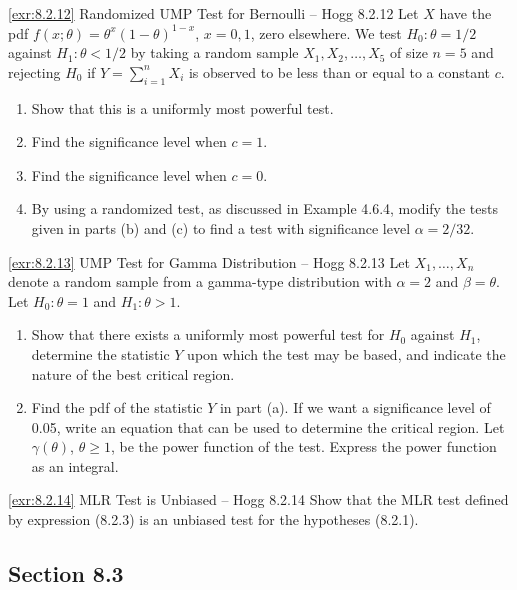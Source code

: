 \begin{exercise}{\ref{exr:8.2.12} Randomized UMP Test for Bernoulli -- Hogg 8.2.12}\label{exr:8.2.12}
Let $X$ have the pdf $f(x; \theta) = \theta^x(1-\theta)^{1-x}$, $x = 0, 1$, zero elsewhere. We test $H_0: \theta = 1/2$ against $H_1: \theta < 1/2$ by taking a random sample $X_1, X_2, \ldots, X_5$ of size $n = 5$ and rejecting $H_0$ if $Y = \sum_{i=1}^n X_i$ is observed to be less than or equal to a constant $c$.
\begin{enumerate}
\item[(a)] Show that this is a uniformly most powerful test.
\item[(b)] Find the significance level when $c = 1$.
\item[(c)] Find the significance level when $c = 0$.
\item[(d)] By using a randomized test, as discussed in Example 4.6.4, modify the tests given in parts (b) and (c) to find a test with significance level $\alpha = 2/32$.
\end{enumerate}
\end{exercise}

\begin{exercise}{\ref{exr:8.2.13} UMP Test for Gamma Distribution -- Hogg 8.2.13}\label{exr:8.2.13}
Let $X_1, \ldots, X_n$ denote a random sample from a gamma-type distribution with $\alpha = 2$ and $\beta = \theta$. Let $H_0: \theta = 1$ and $H_1: \theta > 1$.
\begin{enumerate}
\item[(a)] Show that there exists a uniformly most powerful test for $H_0$ against $H_1$, determine the statistic $Y$ upon which the test may be based, and indicate the nature of the best critical region.
\item[(b)] Find the pdf of the statistic $Y$ in part (a). If we want a significance level of 0.05, write an equation that can be used to determine the critical region. Let $\gamma(\theta)$, $\theta \geq 1$, be the power function of the test. Express the power function as an integral.
\end{enumerate}
\end{exercise}

\begin{exercise}{\ref{exr:8.2.14} MLR Test is Unbiased -- Hogg 8.2.14}\label{exr:8.2.14}
Show that the MLR test defined by expression (8.2.3) is an unbiased test for the hypotheses (8.2.1).
\end{exercise}

\subsection*{Section 8.3}

